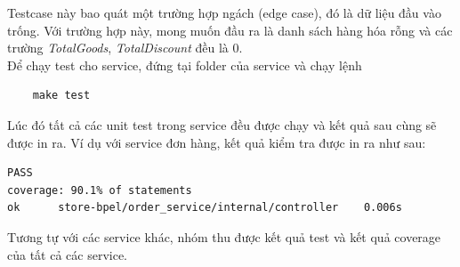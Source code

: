 Testcase này bao quát một trường hợp ngách (edge case), đó là dữ liệu đầu vào trống. Với trường hợp này, mong muốn đầu ra là danh sách hàng hóa rỗng và các trường \emph{TotalGoods}, \emph{TotalDiscount} đều là 0.\\


Để chạy test cho service, đứng tại folder của service và chạy lệnh
\begin{lstlisting}
    make test
\end{lstlisting}

Lúc đó tất cả các unit test trong service đều được chạy và kết quả sau cùng sẽ được in ra. Ví dụ với service đơn hàng, kết quả kiểm tra được in ra như sau:

\begin{lstlisting}
PASS
coverage: 90.1% of statements
ok      store-bpel/order_service/internal/controller    0.006s
\end{lstlisting}

Tương tự với các service khác, nhóm thu được kết quả test và kết quả coverage của tất cả các service.


